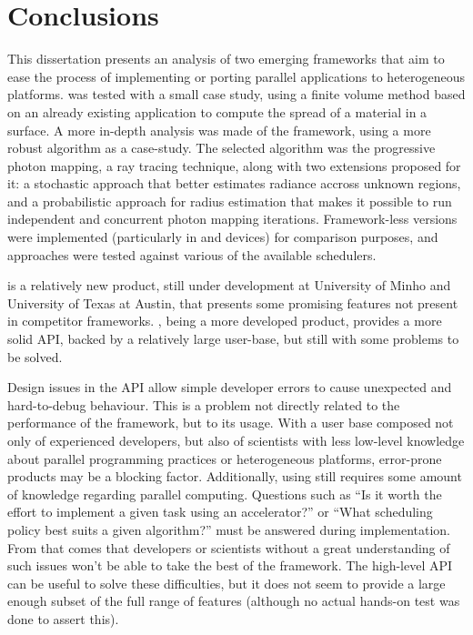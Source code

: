 \documentclass[main.tex]{subfiles}
\begin{document}
\chapter{Conclusions} \label{chapter:conclusions}

This dissertation presents an analysis of two emerging frameworks that aim to ease the process of implementing or porting parallel applications to heterogeneous platforms. \gama was tested with a small case study, using a finite volume method based on an already existing application to compute the spread of a material in a surface.
A more in-depth analysis was made of the \starpu framework, using a more robust algorithm as a case-study. The selected algorithm was the progressive photon mapping, a ray tracing technique, along with two extensions proposed for it: a stochastic approach that better estimates radiance accross unknown regions, and a probabilistic approach for radius estimation that makes it possible to run independent and concurrent photon mapping iterations. Framework-less versions were implemented (particularly in \cpu and \gpu devices) for comparison purposes, and \starpu approaches were tested against various of the available schedulers.

 \gama is a relatively new product, still under development at University of Minho and University of Texas at Austin, that presents some promising features not present in competitor frameworks. \starpu, being a more developed product, provides a more solid API, backed by a relatively large user-base, but still with some problems to be solved.

Design issues in the \starpu API allow simple developer errors to cause unexpected and hard-to-debug behaviour. This is a problem not directly related to the performance of the framework, but to its usage. With a user base composed not only of experienced developers, but also of scientists with less low-level knowledge about parallel programming practices or heterogeneous platforms, error-prone products may be a blocking factor. Additionally, using \starpu still requires some amount of knowledge regarding parallel computing. Questions such as ``Is it worth the effort to implement a given task using an accelerator?'' or ``What scheduling policy best suits a given algorithm?'' must be answered during implementation. From that comes that developers or scientists without a great understanding of such issues won't be able to take the best of the framework.
The high-level \starpu API can be useful to solve these difficulties, but it does not seem to provide a large enough subset of the full range of \starpu features (although no actual hands-on test was done to assert this).
\end{document}
